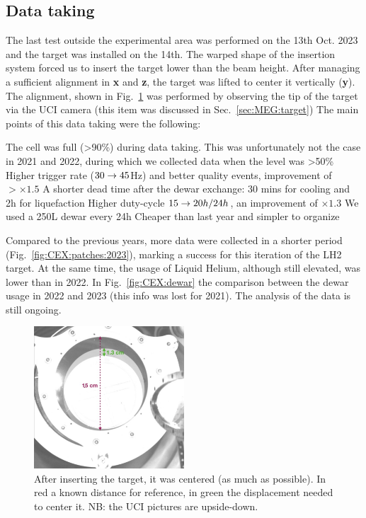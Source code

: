 \begin{refsection}
    \subsection{Data taking}
        The last test outside the experimental area was performed on the 13th Oct. 2023 and the target was installed on the 14th.
        The warped shape of the insertion system forced us to insert the target lower than the beam height. 
        After managing a sufficient alignment in \textbf{x} and \textbf{z}, the target was lifted to center it vertically (\textbf{y}). The alignment, shown in Fig.~\ref{fig:CEX:2023:allignement} was performed by observing the tip of the target via the UCI camera (this item was discussed in Sec.~\ref{sec:MEG:target})
        The main points of this data taking were the following:
        \begin{outline}
            \1 The cell was full (>90\%) during data taking. This was unfortunately not the case in 2021 and 2022, during which we collected data when the level was >50\%
            \2[->] Higher trigger rate ($30\rightarrow45$Hz) and better quality events, improvement of $>\times1.5$
            \1 A shorter dead time after the dewar exchange: 30 mins for cooling and 2h for liquefaction
            \2[->] Higher duty-cycle $15\rightarrow20h/24h$, an improvement of $\times1.3$
            \1 We used a 250L dewar every 24h
            \2[->] Cheaper than last year and simpler to organize
        \end{outline}
        Compared to the previous years, more data were collected in a shorter period (Fig.~\ref{fig:CEX:patches:2023}), marking a success for this iteration of the LH2 target. 
        At the same time, the usage of Liquid Helium, although still elevated, was lower than in 2022. In Fig.~\ref{fig:CEX:dewar} the comparison between the dewar usage in 2022 and 2023 (this info was lost for 2021).
        The analysis of the data is still ongoing.

        \begin{figure}
            \centering
            \includegraphics[width=0.5\textwidth]{Figures/LH2/2023/LH2_UCI_2023.png}
            \caption[CW 2023: target alignment]{After inserting the target, it was centered (as much as possible). In red a known distance for reference, in green the displacement needed to center it. NB: the UCI pictures are upside-down.}
            \label{fig:CEX:2023:allignement}
        \end{figure}


\end{refsection}
